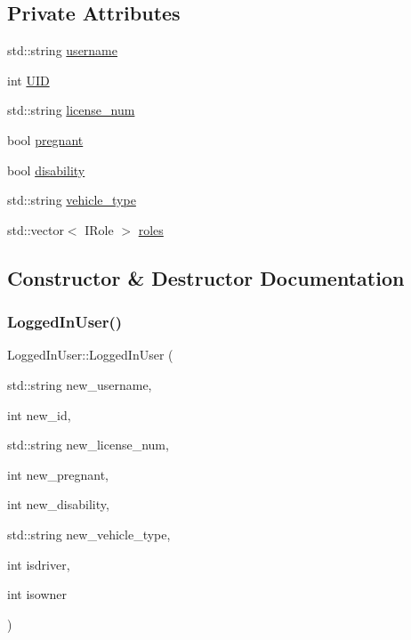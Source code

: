 \subsection*{Private Attributes}
\begin{DoxyCompactItemize}
\item 
std\+::string \mbox{\hyperlink{class_logged_in_user_a8670821dc91d709d13bde0f7449f0e73}{username}}
\item 
int \mbox{\hyperlink{class_logged_in_user_a4022b1beed600f13a23f0fff3511a33d}{U\+ID}}
\item 
std\+::string \mbox{\hyperlink{class_logged_in_user_aaf0493296f1ad85b283b7727cf3a51d9}{license\+\_\+num}}
\item 
bool \mbox{\hyperlink{class_logged_in_user_a5dd187f89453152de1b38bdccae85c33}{pregnant}}
\item 
bool \mbox{\hyperlink{class_logged_in_user_af914bf317e748613c94716abd3a34556}{disability}}
\item 
std\+::string \mbox{\hyperlink{class_logged_in_user_a9df701394f7b2550199eb61435b1be54}{vehicle\+\_\+type}}
\item 
std\+::vector$<$ I\+Role $>$ \mbox{\hyperlink{class_logged_in_user_a5ccb34fd4489acac519c8bc82a20bb5e}{roles}}
\end{DoxyCompactItemize}


\subsection{Constructor \& Destructor Documentation}
\mbox{\label{class_logged_in_user_a02eaa5c2b719e289d76a63cfc8384627}} 
\subsubsection{\texorpdfstring{Logged\+In\+User()}{LoggedInUser()}}
{\footnotesize\ttfamily Logged\+In\+User\+::\+Logged\+In\+User (\begin{DoxyParamCaption}\item[{std\+::string}]{new\+\_\+username,  }\item[{int}]{new\+\_\+id,  }\item[{std\+::string}]{new\+\_\+license\+\_\+num,  }\item[{int}]{new\+\_\+pregnant,  }\item[{int}]{new\+\_\+disability,  }\item[{std\+::string}]{new\+\_\+vehicle\+\_\+type,  }\item[{int}]{isdriver,  }\item[{int}]{isowner }\end{DoxyParamCaption})}



